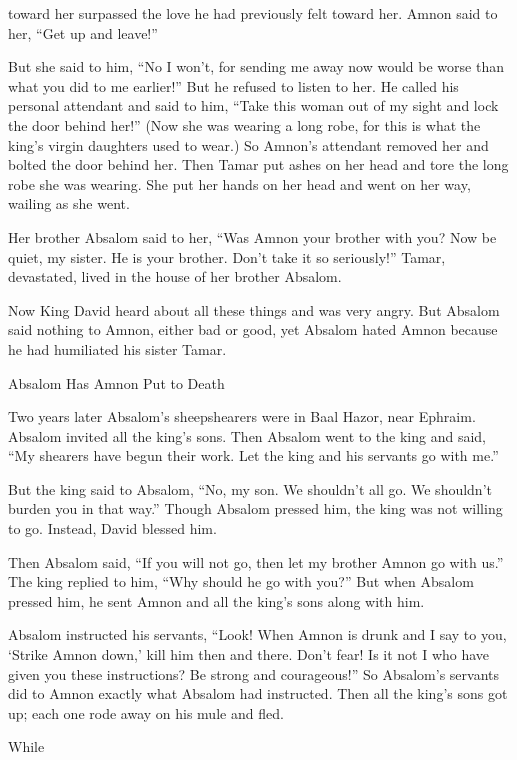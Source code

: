 {toward her surpassed the love
he had
previously felt toward
her. Amnon
said
to her, “Get up
and leave!”
\par }{\PP {}But she said
to him, “No
I won’t, for sending
me away
now would be worse
than what you did
to me earlier!” But he refused
to listen to her.
He called
his personal
attendant
and said
to him, “Take
this
woman out
of my sight and lock
the door
behind her!”
(Now she was wearing a long
robe,
for
this
is what the king’s
virgin
daughters
used to wear.) So Amnon’s attendant
removed
her and bolted
the door
behind her.
Then
Tamar
put ashes
on
her head
and tore
the long
robe
she was wearing. She put
her hands
on
her head
and went
on her way,
wailing as she went.
\par }{\PP {}Her brother
Absalom
said
to
her, “Was
Amnon
your brother
with
you? Now
be quiet,
my sister.
He is
your brother.
Don’t
take it
so seriously!” Tamar,
devastated,
lived
in the house
of her brother
Absalom.
\par }{\PP {}Now King
David
heard
about all
these
things
and was very
angry.
But Absalom
said
nothing to Amnon,
either
bad
or good,
yet Absalom
hated
Amnon
because
he had
humiliated
his sister
Tamar.
\par }{\SH Absalom Has Amnon Put to Death
\par }{\PP {}Two years
later
Absalom’s
sheepshearers
were in Baal Hazor,
near
Ephraim.
Absalom
invited
all
the king’s
sons.
Then Absalom
went
to
the king
and said,
“My shearers
have begun their work. Let
the king
and his servants
go
with me.”
\par }{\PP {}But the king
said
to
Absalom,
“No,
my son.
We shouldn’t
all
go.
We shouldn’t
burden
you in
that way.” Though Absalom pressed
him, the king was not
willing
to go.
Instead, David blessed him.
\par }{\PP {}Then Absalom
said,
“If you will not
go,
then let
my brother
Amnon
go with
us.” The king
replied
to him, “Why
should he go
with you?”
But when Absalom
pressed
him, he sent
Amnon
and all
the king’s
sons
along with him.
\par }{\PP {}Absalom
instructed
his servants,
“Look! When Amnon
is drunk
and I say
to
you, ‘Strike
Amnon
down,’ kill
him then and there. Don’t
fear! Is it not
I
who have given you these instructions? Be strong
and courageous!”
So Absalom’s
servants
did
to Amnon
exactly what
Absalom
had instructed.
Then all
the king’s
sons
got up;
each
one rode
away on
his mule
and fled.
\par }{\PP {}While
}
